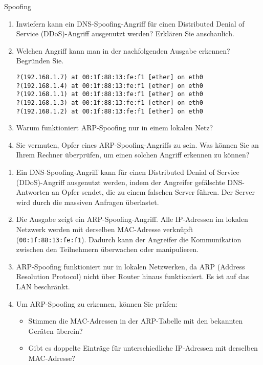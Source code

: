 \documentclass{article}
\begin{document}
\setcounter{subsection}{46}
\begin{exercise}{Spoofing}
  \begin{enumerate}
    \item Inwiefern kann ein DNS-Spoofing-Angriff für einen Distributed Denial of Service (DDoS)-Angriff ausgenutzt werden? Erklären Sie anschaulich.
    \item Welchen Angriff kann man in der nachfolgenden Ausgabe erkennen? Begründen Sie.
      \begin{center}
        \texttt{?(192.168.1.7) at 00:1f:88:13:fe:f1 [ether] on eth0} \\
        \texttt{?(192.168.1.4) at 00:1f:88:13:fe:f1 [ether] on eth0} \\
        \texttt{?(192.168.1.1) at 00:1f:88:13:fe:f1 [ether] on eth0} \\
        \texttt{?(192.168.1.3) at 00:1f:88:13:fe:f1 [ether] on eth0} \\
        \texttt{?(192.168.1.2) at 00:1f:88:13:fe:f1 [ether] on eth0}
      \end{center}
    \item Warum funktioniert ARP-Spoofing nur in einem lokalen Netz?
    \item Sie vermuten, Opfer eines ARP-Spoofing-Angriffs zu sein. Was können Sie an Ihrem Rechner überprüfen, um einen solchen Angriff erkennen zu können?
  \end{enumerate}

  \begin{solution}
    \begin{enumerate}
        \item Ein DNS-Spoofing-Angriff kann für einen Distributed Denial of Service (DDoS)-Angriff ausgenutzt werden, indem der Angreifer gefälschte DNS-Antworten an Opfer sendet, die zu einem falschen Server führen. Der Server wird durch die massiven Anfragen überlastet.
        \item Die Ausgabe zeigt ein ARP-Spoofing-Angriff. Alle IP-Adressen im lokalen Netzwerk werden mit derselben MAC-Adresse verknüpft (\texttt{00:1f:88:13:fe:f1}). Dadurch kann der Angreifer die Kommunikation zwischen den Teilnehmern überwachen oder manipulieren.
        \item ARP-Spoofing funktioniert nur in lokalen Netzwerken, da ARP (Address Resolution Protocol) nicht über Router hinaus funktioniert. Es ist auf das LAN beschränkt.
        \item Um ARP-Spoofing zu erkennen, können Sie prüfen:
        \begin{itemize}
            \item Stimmen die MAC-Adressen in der ARP-Tabelle mit den bekannten Geräten überein?
            \item Gibt es doppelte Einträge für unterschiedliche IP-Adressen mit derselben MAC-Adresse?
        \end{itemize}
    \end{enumerate}
  \end{solution}
\end{exercise}
\end{document}
